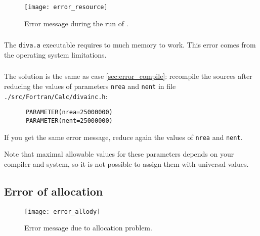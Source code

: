 \begin{figure}[htpb]
\centering
\texttt{[image: error\_resource]}
\caption{Error message during the run of \label{fig:error_resource}.}
\end{figure}

\subsubsection{\question}

The \texttt{diva.a} executable requires to much memory to work. This error comes from the operating system limitations.


\subsubsection{\answer}

The solution is the same as case \ref{sec:error_compile}: recompile the sources after reducing the values of parameters \texttt{nrea} and \texttt{nent} in file \texttt{./src/Fortran/Calc/divainc.h}:
\begin{verbatim}
      PARAMETER(nrea=25000000)
      PARAMETER(nent=25000000)
\end{verbatim}
If you get the same error message, reduce again the values of \texttt{nrea} and \texttt{nent}.

Note that maximal allowable values for these parameters depends on your compiler and system, so it is not possible to assign them with universal values.



\subsection{Error of allocation \label{sec:error_allocation}}

\begin{figure}[htpb]
\centering
\texttt{[image: error\_allody]}
\caption{Error message due to allocation problem.\label{fig:error_allocation}}
\end{figure}

\subsubsection{\question}

